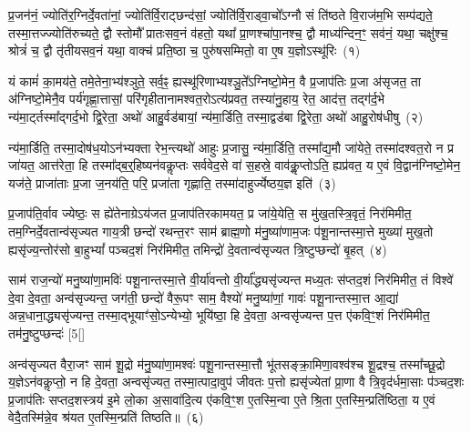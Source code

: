 \setcounter{anuvakam}{0}
प्र॒जन॑नं॒ ज्योति॑र॒ग्निर्दे॒वता॑नां॒ ज्योति॑र्वि॒राट्छन्द॑सां॒ ज्योति॑र्वि॒राड्वा॒चो᳚\-ऽग्नौ सं ति॑ष्ठते वि॒राज॑म॒भि सम्प॑द्यते॒ तस्मा॒\-त्तज्ज्योति॑रुच्यते॒ द्वौ स्तोमौ᳚ प्रातःसव॒नं व॑हतो॒ यथा᳚ प्रा॒णश्चा॑पा॒नश्च॒ द्वौ माध्य॑न्दिन॒ꣳ॒ सव॑नं॒ यथा॒ चक्षु॑श्च॒ श्रोत्रं॑ च॒ द्वौ तृ॑तीयसव॒नं यथा॒ वाक्च॑ प्रति॒ष्ठा च॒ पुरु॑षसम्मितो॒ वा ए॒ष य॒ज्ञो\-ऽस्थू॑रिः~(१)

यं कामं॑ का॒मय॑ते॒ तमे॒तेना॒भ्य॑श्ञुते॒ सर्व॒ꣴ॒ ह्यस्थू॑रिणाभ्यश्ञु॒ते᳚\-ऽग्निष्टो॒मेन॒ वै प्र॒जा\-प॑तिः प्र॒जा अ॑सृजत॒ ता अ॑ग्निष्टो॒मेनै॒व पर्य॑गृह्णा॒त्तासां॒ परि॑गृहीतानामश्वत॒रो\-ऽत्य॑प्रवत॒ तस्या॑नु॒हाय॒ रेत॒ आद॑त्त॒ तद्ग॑र्द॒भे न्य॑मा॒र्ट्तस्मा᳚द्गर्द॒भो द्वि॒रेता॒ अथो॑ आहु॒र्वड॑बायां॒ न्य॑मा॒र्डिति॒ तस्मा॒द्वड॑बा द्वि॒रेता॒ अथो॑ आहु॒रोष॑धीषु~(२)

न्य॑मा॒र्डिति॒ तस्मा॒दोष॑ध॒यो\-ऽन॑भ्यक्ता रेभ॒न्त्यथो॑ आहुः प्र॒जासु॒ न्य॑मा॒र्डिति॒ तस्मा᳚द्य॒मौ जा॑येते॒ तस्मा॑दश्वत॒रो न प्र जा॑यत॒ आत्त॑रेता॒ हि तस्मा᳚द्ब॒र्॒\mbox{}हिष्यन॑वकॢप्तः सर्ववेद॒से वा॑ स॒हस्रे॒ वाव॑कॢ॒प्तो\-ऽति॒ ह्यप्र॑वत॒ य ए॒वं वि॒द्वान॑ग्निष्टो॒मेन॒ यज॑ते॒ प्राजा॑ताः प्र॒जा ज॒नय॑ति॒ परि॒ प्रजा॑ता गृह्णाति॒ तस्मा॑दाहुर्ज्येष्ठय॒ज्ञ इति॑~(३)

प्र॒जा\-प॑ति॒र्वाव ज्येष्ठः॒ स ह्ये॑तेनाग्रे\-ऽय॑जत प्र॒जा\-प॑तिरकामयत॒ प्र जा॑ये॒येति॒ स मु॑ख॒तस्त्रि॒वृतं॒ निर॑मिमीत॒ तम॒ग्नि\-र्दे॒वतान्व॑सृज्यत गाय॒त्री छन्दो॑ रथन्त॒रꣳ साम॑ ब्राह्म॒णो म॑नु॒ष्या॑णाम॒जः प॑शू॒नान्तस्मा॒त्ते मुख्या॑ मुख॒तो ह्यसृ॑ज्य॒न्तोर॑सो बा॒हु\-भ्यां᳚ पञ्चद॒शं निर॑मिमीत॒ तमिन्द्रो॑ दे॒वतान्व॑सृज्यत त्रि॒ष्टुप्छन्दो॑ बृ॒हत्~(४)

साम॑ राज॒न्यो॑ मनु॒ष्या॑णा॒मविः॑ पशू॒नान्तस्मा॒त्ते वी॒र्या॑वन्तो वी॒र्या᳚द्ध्यसृ॑ज्यन्त मध्य॒तः स॑प्तद॒शं निर॑मिमीत॒ तं विश्वे॑ दे॒वा दे॒वता॒ अन्व॑सृज्यन्त॒ जग॑ती॒ छन्दो॑ वैरू॒पꣳ साम॒ वैश्यो॑ मनु॒ष्या॑णां॒ गावः॑ पशू॒नान्तस्मा॒त्त आ॒द्या॑ अन्न॒धाना॒\-द्ध्यसृ॑ज्यन्त॒ तस्मा॒द्भूयाꣳ॑सो॒\-ऽन्येभ्यो॒ भूयि॑ष्ठा॒ हि दे॒वता॒ अन्वसृ॑ज्यन्त प॒त्त ए॑कवि॒ꣳ॒शं निर॑मिमीत॒ तम॑नु॒ष्टुप्छन्दः॑ [5[]

अन्व॑सृज्यत वैरा॒जꣳ साम॑ शू॒द्रो म॑नु॒ष्या॑णा॒मश्वः॑ पशू॒नान्तस्मा॒त्तौ भू॑तसङ्क्रा॒मिणा॒वश्व॑श्च शू॒द्रश्च॒ तस्मा᳚च्छू॒द्रो य॒ज्ञे\-ऽन॑वकॢप्तो॒ न हि दे॒वता॒ अन्वसृ॑ज्यत॒ तस्मा॒त्पादा॒वुप॑ जीवतः प॒त्तो ह्यसृ॑ज्येतां प्रा॒णा वै त्रि॒वृद॑र्धमा॒साः प॑ञ्चद॒शः प्र॒जा\-प॑तिः सप्तद॒शस्त्रय॑ इ॒मे लो॒का अ॒सावा॑दि॒त्य ए॑कवि॒ꣳ॒श ए॒तस्मि॒न्वा ए॒ते श्रि॒ता ए॒तस्मि॒न्प्रति॑ष्ठिता॒ य ए॒वं वेदै॒तस्मि॑न्ने॒व श्र॑यत ए॒तस्मि॒न्प्रति॑ तिष्ठति॥~(६)

